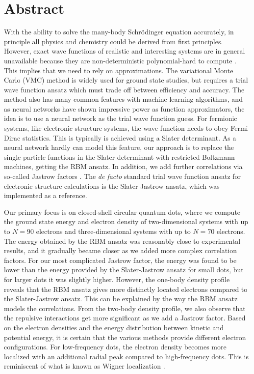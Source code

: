 \newpage
\section*{Abstract}
With the ability to solve the many-body Schrödinger equation accurately, in principle all physics and chemistry could be derived from first principles. However, exact wave functions of realistic and interesting systems are in general unavailable because they are non-deterministic polynomial-hard to compute \supercite{troyer_computational_2005}. This implies that we need to rely on approximations. The variational Monte Carlo (VMC) method is widely used for ground state studies, but requires a trial wave function ansatz which must trade off between efficiency and accuracy. The method also has many common features with machine learning algorithms, and as neural networks have shown impressive power as function approximators, the idea is to use a neural network as the trial wave function guess. For fermionic systems, like electronic structure systems, the wave function needs to obey Fermi-Dirac statistics. This is typically is achieved using a Slater determinant. As a neural network hardly can model this feature, our approach is to replace the single-particle functions in the Slater determinant with restricted Boltzmann machines, getting the RBM ansatz. In addition, we add further correlations via so-called Jastrow factors \supercite{drummond_jastrow_2004}. The \textit{de facto} standard trial wave function ansatz for electronic structure calculations is the Slater-Jastrow ansatz, which was implemented as a reference.

Our primary focus is on closed-shell circular quantum dots, where we compute the ground state energy and electron density of two-dimensional systems with up to $N=90$ electrons and three-dimensional systems with up to $N=70$ electrons. The energy obtained by the RBM ansatz was reasonably close to experimental results, and it gradually became closer as we added more complex correlation factors. For our most complicated Jastrow factor, the energy was found to be lower than the energy provided by the Slater-Jastrow ansatz for small dots, but for larger dots it was slightly higher. However, the one-body density profile reveals that the RBM ansatz gives more distinctly located electrons compared to the Slater-Jastrow ansatz. This can be explained by the way the RBM ansatz models the correlations. From the two-body density profile, we also observe that the repulsive interactions get more significant as we add a Jastrow factor. Based on the electron densities and the energy distribution between kinetic and potential energy, it is certain that the various methods provide different electron configurations. For low-frequency dots, the electron density becomes more localized with an additional radial peak compared to high-frequency dots. This is reminiscent of what is known as Wigner localization \supercite{ghosal_incipient_2007}.

